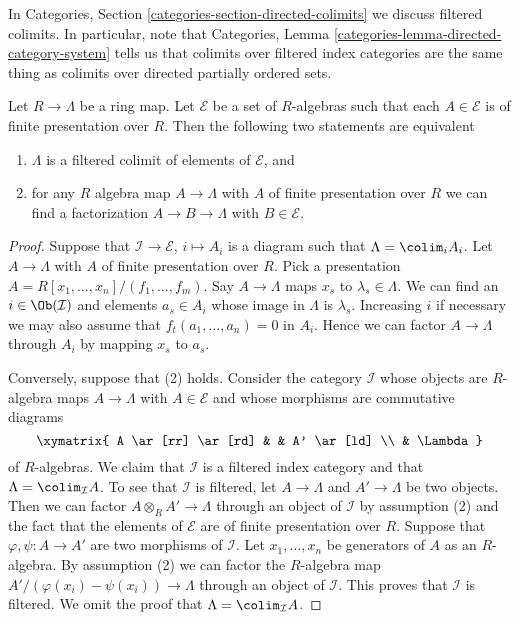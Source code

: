 \noindent
In Categories, Section \ref{categories-section-directed-colimits}
we discuss filtered colimits. In particular, note that
Categories, Lemma \ref{categories-lemma-directed-category-system}
tells us that colimits over filtered index categories are the same
thing as colimits over directed partially ordered sets.

\begin{lemma}
\label{lemma-when-colimit}
Let $R \to \Lambda$ be a ring map. Let $\mathcal{E}$ be a set of $R$-algebras
such that each $A \in \mathcal{E}$ is of finite presentation over $R$.
Then the following two statements are equivalent
\begin{enumerate}
\item $\Lambda$ is a filtered colimit of elements of $\mathcal{E}$, and
\item for any $R$ algebra map $A \to \Lambda$ with $A$ of finite
presentation over $R$ we can find a factorization $A \to B \to \Lambda$
with $B \in \mathcal{E}$.
\end{enumerate}
\end{lemma}

\begin{proof}
Suppose that $\mathcal{I} \to \mathcal{E}$, $i \mapsto A_i$
is a diagram such that $\Lambda = \colim_i A_i$. Let $A \to \Lambda$
with $A$ of finite presentation over $R$. Pick a presentation
$A = R[x_1, \ldots, x_n]/(f_1, \ldots, f_m)$. Say $A \to \Lambda$
maps $x_s$ to $\lambda_s \in \Lambda$. We can find an $i \in \Ob(\mathcal{I})$
and elements $a_s \in A_i$ whose image in $\Lambda$ is $\lambda_s$.
Increasing $i$ if necessary we may also assume that
$f_t(a_1, \ldots, a_n) = 0$ in $A_i$. Hence we can factor $A \to \Lambda$
through $A_i$ by mapping $x_s$ to $a_s$.

\medskip\noindent
Conversely, suppose that (2) holds. Consider the category $\mathcal{I}$
whose objects are $R$-algebra maps $A \to \Lambda$ with $A \in \mathcal{E}$
and whose morphisms are commutative diagrams
$$
\xymatrix{
A \ar[rr] \ar[rd] & & A' \ar[ld] \\
& \Lambda
}
$$
of $R$-algebras. We claim that $\mathcal{I}$ is a filtered index category
and that $\Lambda = \colim_\mathcal{I} A$. To see that $\mathcal{I}$
is filtered, let $A \to \Lambda$ and $A' \to \Lambda$ be two objects.
Then we can factor $A \otimes_R A' \to \Lambda$ through an object
of $\mathcal{I}$ by assumption (2) and the fact that the elements
of $\mathcal{E}$ are of finite presentation over $R$. Suppose that
$\varphi, \psi : A \to A'$ are two morphisms of $\mathcal{I}$.
Let $x_1, \ldots, x_n$ be generators of $A$ as an $R$-algebra.
By assumption (2)  we can factor the $R$-algebra map
$A'/(\varphi(x_i) - \psi(x_i)) \to \Lambda$ through an object of
$\mathcal{I}$. This proves that $\mathcal{I}$ is filtered.
We omit the proof that $\Lambda = \colim_\mathcal{I} A$.
\end{proof}


